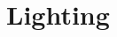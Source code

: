\documentclass[../main]{subfiles}
\begin{document}
\chapter{Lighting} \label{chp:}






\end{document}
